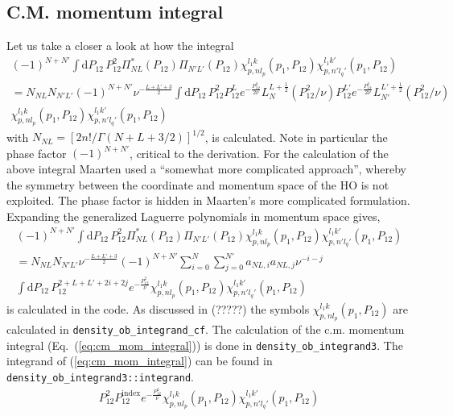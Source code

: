 \documentclass[10pt]{article}
\begin{document}
\subsection{C.M. momentum integral}
\label{ssec:cm_mom_integral}
Let us take a closer a look at how the integral
\begin{multline}
(-1)^{N+N'}\int \text{d} P_{12} \, P_{12}^{2} \Pi^{*}_{N L}(P_{12}) \Pi_{N' L'}(P_{12}) \chi_{p,nl_p}^{l_1 k}(p_1,P_{12}) \chi_{p,n'l_q'}^{l_1 k'}(p_1,P_{12}) \\
= N_{NL} N_{N'L'} (-1)^{N+N'} \nu^{ - \frac{L+L'+3}{2}} \int \text{d} P_{12} \, P_{12}^{2} 
P_{12}^{L} e^{- \frac{P_{12}^{2}}{2 \nu}} L_{N}^{L+\frac{1}{2}}( P_{12}^{2}/\nu) 
P_{12}^{L'} e^{- \frac{P_{12}^{2}}{2 \nu}} L_{N'}^{L'+\frac{1}{2}}( P_{12}^{2}/\nu)  \\
\chi_{p,nl_p}^{l_1 k}(p_1,P_{12}) \chi_{p,n'l_q'}^{l_1 k'}(p_1,P_{12}) \,
\end{multline}
with $N_{NL} = [ 2n! / \Gamma( N + L + 3/2) ]^{1/2}$, is calculated.
Note in particular the phase factor $(-1)^{N+N'}$, critical to the derivation.
For the calculation of the above integral Maarten used a ``somewhat more complicated approach'', whereby the symmetry between the coordinate and momentum space of the HO is not exploited.
The phase factor is hidden in Maarten's more complicated formulation.
Expanding the generalized Laguerre polynomials in momentum space gives,
\begin{multline}
(-1)^{N+N'} \int \text{d} P_{12} \, P_{12}^{2} \Pi^{*}_{N L}(P_{12}) \Pi_{N' L'}(P_{12}) \chi_{p,nl_p}^{l_1 k}(p_1,P_{12}) \chi_{p,n'l_q'}^{l_1 k'}(p_1,P_{12}) \\
= N_{NL} N_{N'L'} \nu^{ - \frac{L+L'+3}{2}} (-1)^{N+N'}
\sum_{i=0}^{N} \sum_{j=0}^{N'} a_{NL,i} a_{NL,j} \nu^{-i-j} \\
 \int \text{d} P_{12} \, P_{12}^{2+L+L'+2i+2j}  e^{- \frac{P_{12}^{2}}{ \nu}}  \chi_{p,nl_p}^{l_1 k}(p_1,P_{12}) \chi_{p,n'l_q'}^{l_1 k'}(p_1,P_{12})
\label{eq:cm_mom_integral}
\end{multline}
is calculated in the code. As discussed in (?????) the symbols $\chi_{p,nl_p}^{l_1 k}(p_1,P_{12})$ are calculated in \texttt{density\_ob\_integrand\_cf}. The calculation of the c.m. momentum integral (Eq.~(\ref{eq:cm_mom_integral})) is done in \texttt{density\_ob\_integrand3}. The integrand of (\ref{eq:cm_mom_integral}) can be found in \texttt{density\_ob\_integrand3::integrand}.
\begin{align*}
	P_{12}^{2} P_{12}^{\text{index}} e^{-\frac{P_{12}^{2}}{\nu}}  \chi_{p,nl_p}^{l_1 k}(p_1,P_{12}) \chi_{p,n'l_q'}^{l_1 k'}(p_1,P_{12}) 
\end{align*}
\end{document}
